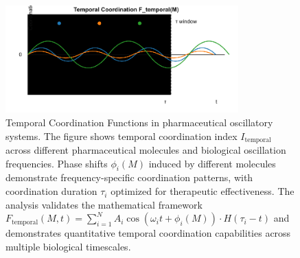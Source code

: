 \begin{figure}[htbp]
\centering
\includegraphics[width=0.8\textwidth]{images/temporal_coordination.pdf}
\caption{Temporal Coordination Functions in pharmaceutical oscillatory systems. The figure shows temporal coordination index $I_{\text{temporal}}$ across different pharmaceutical molecules and biological oscillation frequencies. Phase shifts $\phi_i(M)$ induced by different molecules demonstrate frequency-specific coordination patterns, with coordination duration $\tau_i$ optimized for therapeutic effectiveness. The analysis validates the mathematical framework $F_{\text{temporal}}(M, t) = \sum_{i=1}^{N} A_i \cos(\omega_i t + \phi_i(M)) \cdot H(\tau_i - t)$ and demonstrates quantitative temporal coordination capabilities across multiple biological timescales.}
\label{fig:temporal_coordination}
\end{figure}
